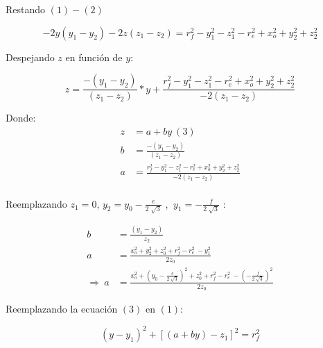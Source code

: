         Restando $(1)-(2)$
        
        \begin{equation*}
         -2y \left( y_{1}-y_{2} \right) -2z \left( z_{1}-z_{2} \right) = r_{f}^{2}-y_{1}^{2}-z_{1}^{2}- r_{e}^{2}+x_{o}^{2}+y_{2}^{2}+z_{2}^{2} 
        \end{equation*}
        
        Despejando $z$ en función de $y$:
        
        \begin{equation*}
         z=\frac{- \left( y_{1}-y_{2} \right) }{ \left( z_{1}-z_{2} \right) }\ast y+ \frac{r_{f}^{2}-y_{1}^{2}-z_{1}^{2}- r_{e}^{2}+x_{o}^{2}+y_{2}^{2}+z_{2}^{2}}{-2 \left( z_{1}-z_{2} \right)}
        \end{equation*}
        
        Donde:  
        \begin{align*}
             z&=a+by ~\left( 3 \right)\\
             b&=\frac{- \left( y_{1}-y_{2} \right) }{ \left( z_{1}-z_{2} \right) }~\\
             a&= \frac{r_{f}^{2}-y_{1}^{2}-z_{1}^{2}- r_{e}^{2}+x_{o}^{2}+y_{2}^{2}+z_{2}^{2}}{-2 \left( z_{1}-z_{2} \right) } \\ 
        \end{align*}
        
                \newpage

        Reemplazando  $z_{1}=0$, $y_{2}=y_{0}-\frac{e}{2\sqrt[]{3}}$  , $ ~y_{1}=-\frac{f}{2\sqrt[]{3}}$ :
        
        \begin{align*}
         b&=\frac{ \left( y_{1}-y_{2} \right) }{z_{2}}~ \\ 
         a&= \frac{x_{o}^{2}+y_{2}^{2}+z_{0}^{2}+r_{f}^{2}- r_{e}^{2}~-y_{1}^{2}}{2z_{0}} \\
         \Longrightarrow ~ a&= \frac{x_{o}^{2}+ \left( y_{0}-\frac{e}{2\sqrt[]{3}} \right) ^{2}+z_{0}^{2}+r_{f}^{2}- r_{e}^{2}~- \left( -\frac{f}{2\sqrt[]{3}} \right) ^{2}}{2z_{0}}
        \end{align*}
        
        Reemplazando la ecuación $(3)$ en $(1)$:
        
        \begin{equation*}
         \left( y-y_{1} \right) ^{2} + \left[  \left( a+by \right)  -z_{1} \right] ^{2}= r_{f}^{2} 
        \end{equation*}
        
